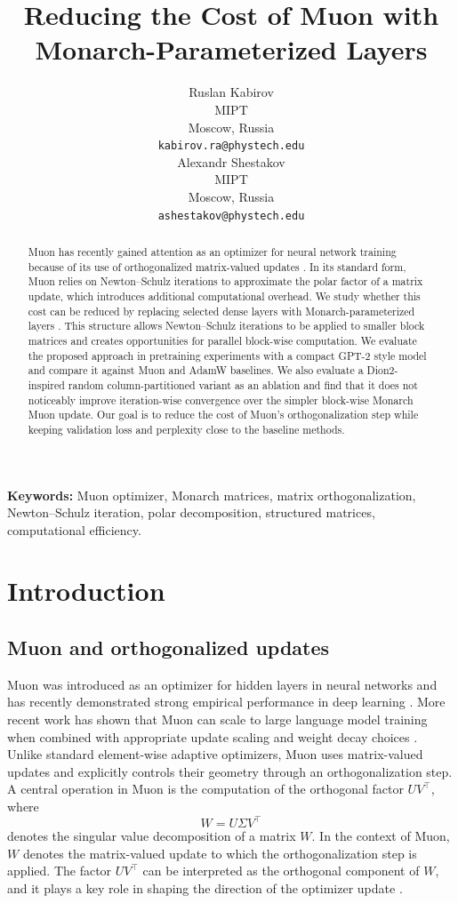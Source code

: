 \documentclass{article}
\title{Reducing the Cost of Muon with Monarch-Parameterized Layers}
\author{
  Ruslan Kabirov\\
  MIPT\\
  Moscow, Russia\\
  \texttt{kabirov.ra@phystech.edu}\\
  \And
  Alexandr Shestakov\\
  MIPT\\
  Moscow, Russia\\
  \texttt{ashestakov@phystech.edu}\\
}
\begin{document}
\maketitle

\begin{abstract}
Muon has recently gained attention as an optimizer for neural network training because of its use of orthogonalized matrix-valued updates \cite{jordan2024muon,liu2025muonscalablellmtraining}. In its standard form, Muon relies on Newton--Schulz iterations to approximate the polar factor of a matrix update, which introduces additional computational overhead. We study whether this cost can be reduced by replacing selected dense layers with Monarch-parameterized layers \cite{dao2022monarchexpressivestructuredmatrices}. This structure allows Newton--Schulz iterations to be applied to smaller block matrices and creates opportunities for parallel block-wise computation. We evaluate the proposed approach in pretraining experiments with a compact GPT-2 style model and compare it against Muon and AdamW baselines. We also evaluate a Dion2-inspired random column-partitioned variant as an ablation and find that it does not noticeably improve iteration-wise convergence over the simpler block-wise Monarch Muon update. Our goal is to reduce the cost of Muon's orthogonalization step while keeping validation loss and perplexity close to the baseline methods.
\end{abstract}

\textbf{Keywords:} Muon optimizer, Monarch matrices, matrix orthogonalization, Newton--Schulz iteration, polar decomposition, structured matrices, computational efficiency.

\section{Introduction}\label{sec:intro}

\subsection{Muon and orthogonalized updates}

Muon was introduced as an optimizer for hidden layers in neural networks and has recently demonstrated strong empirical performance in deep learning \cite{jordan2024muon}. More recent work has shown that Muon can scale to large language model training when combined with appropriate update scaling and weight decay choices \cite{liu2025muonscalablellmtraining}. Unlike standard element-wise adaptive optimizers, Muon uses matrix-valued updates and explicitly controls their geometry through an orthogonalization step. A central operation in Muon is the computation of the orthogonal factor \(UV^\top\), where
\[
W = U \Sigma V^\top
\]
denotes the singular value decomposition of a matrix \(W\). In the context of Muon, \(W\) denotes the matrix-valued update to which the orthogonalization step is applied. The factor \(UV^\top\) can be interpreted as the orthogonal component of \(W\), and it plays a key role in shaping the direction of the optimizer update \cite{jordan2024muon,liu2025muonscalablellmtraining}.
\end{document}
